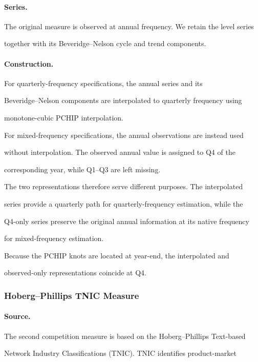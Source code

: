 \documentclass[11pt]{article}
\begin{document}
\paragraph{Series.}

The original measure is observed at annual frequency. We retain the level series

together with its Beveridge--Nelson cycle and trend components.

\paragraph{Construction.}

For quarterly-frequency specifications, the annual series and its

Beveridge--Nelson components are interpolated to quarterly frequency using

monotone-cubic PCHIP interpolation.

For mixed-frequency specifications, the annual observations are instead used

without interpolation. The observed annual value is assigned to Q4 of the

corresponding year, while Q1--Q3 are left missing.

The two representations therefore serve different purposes. The interpolated

series provide a quarterly path for quarterly-frequency estimation, while the

Q4-only series preserve the original annual information at its native frequency

for mixed-frequency estimation.

Because the PCHIP knots are located at year-end, the interpolated and

observed-only representations coincide at Q4.



\subsubsection{Hoberg--Phillips TNIC Measure}

\paragraph{Source.}

The second competition measure is based on the Hoberg--Phillips Text-based

Network Industry Classifications (TNIC). TNIC identifies product-market
\end{document}
